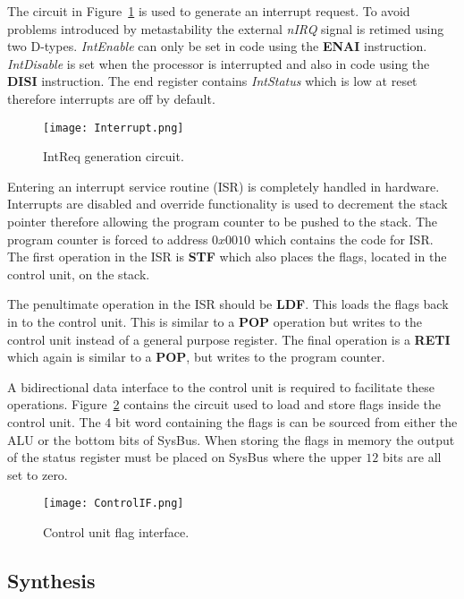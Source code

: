 The circuit in Figure~\ref{fig:IntReqCircuit} is used to generate an interrupt request.
To avoid problems introduced by metastability the external \textit{nIRQ} signal is retimed using two D-types.
\textit{IntEnable} can only be set in code using the \textbf{ENAI} instruction.
\textit{IntDisable} is set when the processor is interrupted and also in code using the \textbf{DISI} instruction.
The end register contains \textit{IntStatus} which is low at reset therefore interrupts are off by default. 

\begin{figure}[ht]
   \centering
    \texttt{[image: Interrupt.png]}
		\caption{IntReq generation circuit.}
		\label{fig:IntReqCircuit}
\end{figure}


Entering an interrupt service routine (ISR) is completely handled in hardware. 
Interrupts are disabled and override functionality is used to decrement the stack pointer therefore allowing the program counter to be pushed to the stack.
The program counter is forced to address $0x0010$ which contains the code for ISR. 
The first operation in the ISR is \textbf{STF} which also places the flags, located in the control unit, on the stack.

The penultimate operation in the ISR should be \textbf{LDF}. This loads the flags back in to the control unit.
This is similar to a \textbf{POP} operation but writes to the control unit instead of a general purpose register. 
The final operation is a \textbf{RETI} which again is similar to a \textbf{POP}, but writes to the program counter.

A bidirectional data interface to the control unit is required to facilitate these operations. 
Figure~\ref{fig:FlagCircuit} contains the circuit used to load and store flags inside the control unit.
The $4$ bit word containing the flags is can be sourced from either the ALU or the bottom bits of SysBus. 
When storing the flags in memory the output of the status register must be placed on SysBus where the upper $12$ bits are all set to zero.

\begin{figure}[ht]
   \centering
    \texttt{[image: ControlIF.png]}
		\caption{Control unit flag interface.}
		\label{fig:FlagCircuit}
\end{figure}





\subsection{Synthesis}

